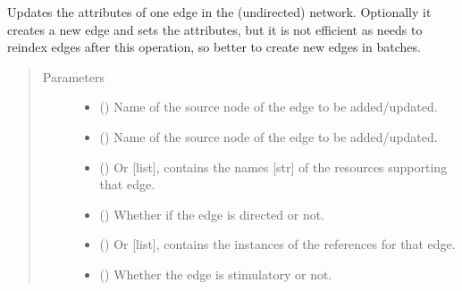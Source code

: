 \documentclass[letterpaper,10pt,english]{sphinxmanual}
\begin{document}
\begin{fulllineitems}

\begin{fulllineitems}
\label{\detokenize{main:pypath.main.PyPath.add_update_edge}}
Updates the attributes of one edge in the (undirected) network.
Optionally it creates a new edge and sets the attributes, but it
is not efficient as  needs to reindex edges
after this operation, so better to create new edges in batches.
\begin{quote}\begin{description}
\item[{Parameters}] \leavevmode\begin{itemize}
\item {} 
 () \textendash{} Name of the source node of the edge to be added/updated.

\item {} 
 () \textendash{} Name of the source node of the edge to be added/updated.

\item {} 
 () \textendash{} Or {[}list{]}, contains the names {[}str{]} of the resources
supporting that edge.

\item {} 
 () \textendash{} Whether if the edge is directed or not.

\item {} 
 () \textendash{} Or {[}list{]}, contains the instances of the references
 for that edge.

\item {} 
 () \textendash{} Whether the edge is stimulatory or not.


\end{itemize}
\end{description}
\end{quote}
\end{fulllineitems}
\end{fulllineitems}
\end{document}
